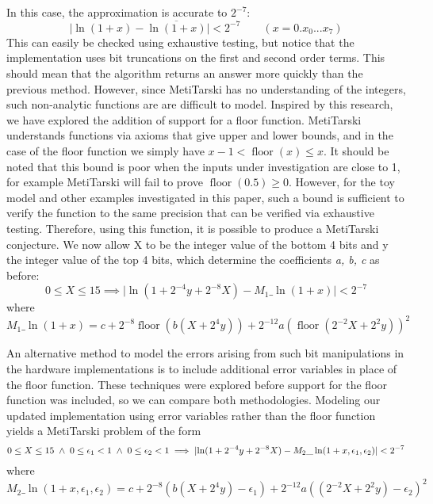 \documentclass[a4]{article}
\newcommand{\abs}[1]{\lvert#1\rvert}
\newcommand{\floor}{\mathop{\textrm{floor}}\nolimits}
\begin{document}
\noindent In this case, the approximation is accurate to $2^{-7}$: 
\[ 
\abs{\ln(1+x)-\overline{\ln(1+x)}} <2^{-7} \qquad (x= 0.x_0...x_7) \]
This can easily be checked using exhaustive testing, but notice that the implementation uses bit truncations on the first and second order terms. This should mean that the algorithm returns an answer more quickly than the previous method. However, since MetiTarski has no understanding of the integers, such non-analytic functions are are difficult to model. Inspired by this research, we have explored the addition of support for a floor function. MetiTarski understands functions via axioms that give upper and lower bounds, and in the case of the floor function we simply have $x-1< \floor(x)\le x$. It should be noted that this bound is poor when the inputs under investigation are close to 1, for example MetiTarski will fail to prove $\floor(0.5)\geq 0$.
However, for the toy model and other examples investigated in this paper, such a bound is sufficient to verify the function to the same precision that can be verified via exhaustive testing. Therefore, using this function, it is possible to produce a MetiTarski conjecture. We now allow X to be the integer value of the bottom 4 bits and y the integer value of the top 4 bits, which determine the coefficients \textit{a, b, c} as before:
\[
0\le X \le 15 \implies \abs{\ln(1+2^{-4}y+2^{-8}X) - M_1\_\ln(1+x)} <2^{-7}
\]
where $$M_1\_\ln(1+x)=c+2^{-8}\floor(b(X+2^{4}y))+2^{-12}a(\floor(2^{-2}X+2^{2}y))^2$$

An alternative method to model the errors arising from such bit manipulations in the hardware implementations is to include additional error variables in place of the floor function. These techniques were explored before support for the floor function was included, so we can compare both methodologies. Modeling our updated implementation using error variables rather than the floor function yields a MetiTarski problem of the form
$$	0\le X \le 15 \hspace{0.1cm} \land \hspace{0.1cm} 0\le \epsilon_1<1\hspace{0.1cm} \land \hspace{0.1cm} 0\le \epsilon_2<1 \newline
\implies \abs{\ln(1+2^{-4}y+2^{-8}X) - M_2\_\ln(1+x,\epsilon_1,\epsilon_2)} < 2^{-7}$$
where
$$M_2\_\ln(1+x,\epsilon_1,\epsilon_2)=c+2^{-8}(b(X+2^{4}y)-\epsilon_1)+2^{-12}a((2^{-2}X+2^{2}y)-\epsilon_2)^2$$
\end{document}
